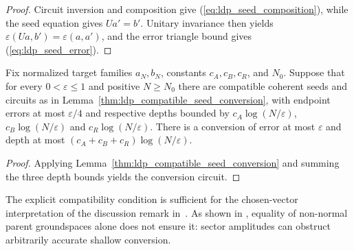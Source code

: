 \begin{proof}
    \leanok
    Circuit inversion and composition give
    (\ref{eq:ldp_seed_composition}), while the seed equation gives $Ua'=b'$.
    Unitary invariance then yields $\varepsilon(Ua,b')=\varepsilon(a,a')$, and
    the error triangle bound gives (\ref{eq:ldp_seed_error}).
\end{proof}

\begin{lemma}
    \label{thm:ldp_compatible_seed_log_depth}
    \leanok
    Fix normalized target families $a_N,b_N$, constants $c_A,c_B,c_R$,
    and $N_0$. Suppose that for every $0<\varepsilon\leq1$ and positive
    $N\geq N_0$ there are compatible coherent seeds and circuits as in
    Lemma~\ref{thm:ldp_compatible_seed_conversion}, with endpoint errors
    at most $\varepsilon/4$ and respective depths bounded by
    $c_A\log(N/\varepsilon)$, $c_B\log(N/\varepsilon)$ and
    $c_R\log(N/\varepsilon)$. There is a conversion of error at most
    $\varepsilon$ and depth at most
    $(c_A+c_B+c_R)\log(N/\varepsilon)$.
\end{lemma}
\begin{proof}
    \leanok
    Applying Lemma~\ref{thm:ldp_compatible_seed_conversion} and summing the
    three depth bounds yields the conversion circuit.
\end{proof}

The explicit compatibility condition is sufficient for the chosen-vector
interpretation of the discussion remark in~\cite{Malz2024Preparation}.
As shown in \cite{gap:mswc24_same_phase_compatible_seed}, equality of non-normal parent groundspaces alone does not ensure it:
sector amplitudes can obstruct arbitrarily accurate shallow conversion.
